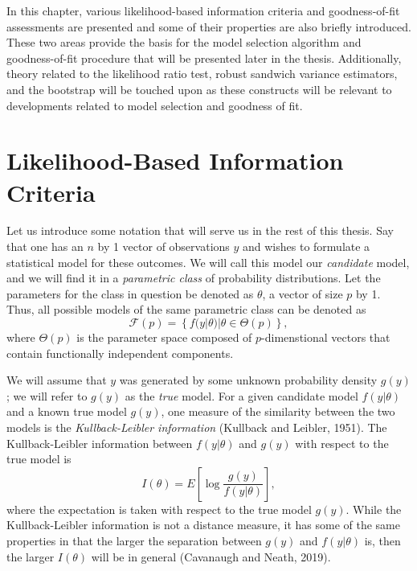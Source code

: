 \doublespace
{}
		In this chapter, various likelihood-based information criteria and goodness-of-fit assessments are presented and some of their properties are also briefly introduced.
		These two areas provide the basis for the model selection algorithm and goodness-of-fit procedure that will be presented later in the thesis. Additionally, theory
		related to the likelihood ratio test, robust sandwich variance estimators, and the bootstrap will be touched upon as these constructs will be relevant to developments
		related to model selection and goodness of fit.
		
		\section{Likelihood-Based Information Criteria}

		Let us introduce some notation that will serve us in the rest of this thesis. Say that one has an $n$ by 1  vector of observations $y$ and wishes to formulate a
		statistical model for these outcomes. We will call this model our \textit{candidate} model, and we will find it in a \textit{parametric class} of probability distributions.
		Let the parameters for the class in question be denoted as $\theta$, a vector of size $p$ by 1. Thus, all possible models of the same parametric class can be denoted
		as
		\begin{equation}
			\mathcal{F}(p) = \left\{ f(y|\theta) | \theta \in \Theta(p) \right\} ,
		\end{equation}
		where $\Theta(p)$ is the parameter space composed of $p$-dimenstional vectors that contain functionally independent components.

		We will assume that $y$ was generated by some unknown probability density $g(y)$; we will refer to $g(y)$ as the \textit{true} model. For a given candidate model $f(y|\theta)$
		and a known true model $g(y)$, one measure of the similarity between the two models is the \textit{Kullback-Leibler information} (Kullback and Leibler, 1951). The Kullback-Leibler
		information between $f(y|\theta)$ and $g(y)$ with respect to the true model is
		\begin{equation}
			I(\theta) = E \left[ \log \frac{g(y)}{f(y|\theta)} \right],
		\end{equation}
		where the expectation is taken with respect to the true model $g(y)$. While the Kullback-Leibler information is not a distance measure, it has some of the same properties in
		that the larger the separation between $g(y)$ and $f(y|\theta)$ is, then the larger $I(\theta)$ will be in general (Cavanaugh and Neath, 2019).
		
